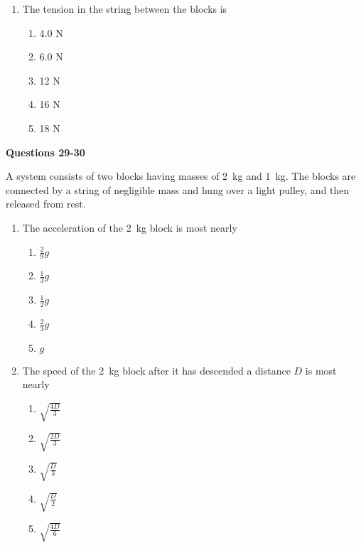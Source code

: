 \documentclass{../../oss-apphys}
\begin{document}
\begin{multicols}{2}
\begin{enumerate}[resume,leftmargin=18pt]
  \item The tension in the string between the blocks is
    \begin{enumerate}[noitemsep,topsep=0pt,leftmargin=18pt,label=(\Alph*)]
    \item 4.0 N
    \item 6.0 N
    \item 12 N
    \item 16 N
    \item 18 N
    \end{enumerate}
  \end{enumerate}
  \columnbreak
  
  \textbf{Questions 29-30}

  A system consists of two blocks having masses of \SI{2}{\kilo\gram} and
  \SI{1}{\kilo\gram}. The blocks are connected by a string of negligible mass
  and hung over a light pulley, and then released from rest.
  \begin{center}
  \end{center}
  \begin{enumerate}[resume,leftmargin=18pt]
  \item The acceleration of the \SI{2}{\kilo\gram} block is most nearly
    \begin{enumerate}[noitemsep,topsep=0pt,leftmargin=18pt,label=(\Alph*)]
    \item $\frac{2}{9}g$
    \item $\frac{1}{3}g$
    \item $\frac{1}{2}g$
    \item $\frac{2}{3}g$
    \item $g$
    \end{enumerate}
  \item The speed of the \SI{2}{\kilo\gram} block after it has descended a
    distance $D$ is most nearly
    \begin{enumerate}[noitemsep,topsep=0pt,leftmargin=18pt,label=(\Alph*)]
    \item $\displaystyle\sqrt{\frac{4D}{3}}$
    \item $\displaystyle\sqrt{\frac{2D}{3}}$
    \item $\displaystyle\sqrt{\frac{D}{3}}$
    \item $\displaystyle\sqrt{\frac{D}{2}}$
    \item $\displaystyle\sqrt{\frac{4D}{6}}$
    \end{enumerate}
  \end{enumerate}
  \columnbreak
  

\end{multicols}
\end{document}
